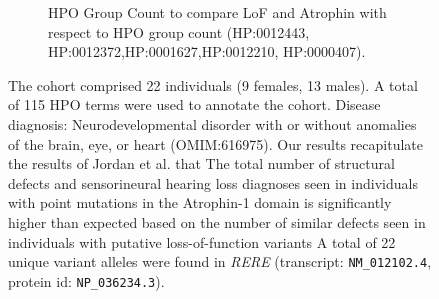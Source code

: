 \begin{figure}[htbp]
\vspace{2em}

\begin{subfigure}[b]{0.95\textwidth}
\captionsetup{justification=raggedright,singlelinecheck=false}
\caption{HPO Group Count to compare LoF and Atrophin with respect to HPO group count (HP:0012443, HP:0012372,HP:0001627,HP:0012210, HP:0000407).}
\end{subfigure}

\vspace{2em}

\caption{ The cohort comprised 22 individuals (9 females, 13 males). A total of 115 HPO terms were used to annotate the cohort. 
Disease diagnosis: Neurodevelopmental disorder with or without anomalies of the brain, eye, or heart (OMIM:616975). 
Our results recapitulate the results of  Jordan et al. \cite{PMID_29330883} that The total number of structural defects and sensorineural hearing loss diagnoses seen in individuals with point mutations in the 
Atrophin-1 domain is significantly higher than expected based on the number of similar defects seen in individuals with putative loss-of-function variants
A total of 22 unique variant alleles were found in \textit{RERE} (transcript: \texttt{NM\_012102.4}, protein id: \texttt{NP\_036234.3}).}
\end{figure}
